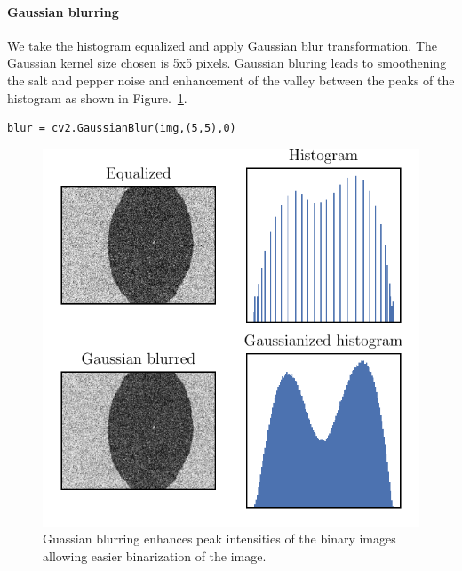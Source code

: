 \documentclass[12pt, twoside, a4paper]{article}
\begin{document}
\paragraph{Gaussian blurring}
We take the histogram equalized and apply Gaussian blur transformation. The Gaussian kernel size chosen is 5x5 pixels. Gaussian bluring leads to smoothening the salt and pepper noise and enhancement of the valley between the peaks of the histogram as shown in Figure.~\ref{openCV gaussian blurring}.
%
\begin{verbatim}
blur = cv2.GaussianBlur(img,(5,5),0)
\end{verbatim}
%
%
\begin{figure}[!htbp]
	\centering
	\includegraphics[scale=1.0]{figures/02_GaussianBlurringEffect.pdf}
	\caption{Guassian blurring enhances peak intensities of the binary images allowing easier binarization of the image.
	}
	\label{openCV gaussian blurring}
\end{figure}
%
\end{document}

